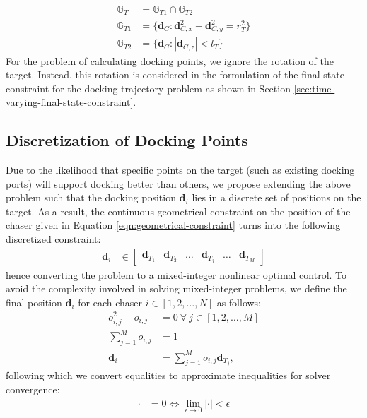 \begin{align}
    {\mathbb{G}}_T&={\mathbb{G}}_{T1}\cap{\mathbb{G}}_{T2}\\
    {\mathbb{G}}_{T1}&=\{\boldsymbol{d}_C:\boldsymbol{d}_{C,x}^2+\boldsymbol{d}_{C,y}^2=r_T^2\}\\
    {\mathbb{G}}_{T2}&=\{\boldsymbol{d}_C:|\boldsymbol{d}_{C,z}|<l_T\}
\end{align}
For the problem of calculating docking points, we ignore the rotation of the target. Instead, this rotation is considered in the formulation of the final state constraint for the docking trajectory problem as shown in Section \ref{sec:time-varying-final-state-constraint}.
\subsection{Discretization of Docking Points}
Due to the likelihood that specific points on the target (such as existing docking ports) will support docking better than others, we propose extending the above problem such that the docking position $\boldsymbol{d}_{i}$ lies in a discrete set of positions on the target.
As a result, the continuous geometrical constraint on the position of the chaser given in Equation \ref{eqn:geometrical-constraint} turns into the following discretized constraint:
\begin{align}
    \boldsymbol{d}_{i}&\in\begin{bmatrix}
        \boldsymbol{d}_{T_1}&\boldsymbol{d}_{T_2}&\ldots&\boldsymbol{d}_{T_j}&\ldots&\boldsymbol{d}_{T_M}
    \end{bmatrix}
\end{align}
hence converting the problem to a mixed-integer nonlinear optimal control.
To avoid the complexity involved in solving mixed-integer problems, we define the final position $\boldsymbol{d}_{i}$ for each chaser $i\in[1,2,\ldots,N]$ as follows:
\begin{align}
    o_{i,j}^2-o_{i,j}&=0\ \forall\ j\in[1, 2, \ldots, M]\\
    \sum_{j=1}^Mo_{i,j}&=1\\
    \boldsymbol{d}_{i}&=\sum_{j=1}^Mo_{i,j}\boldsymbol{d}_{T_j},
\end{align}
following which we convert equalities to approximate inequalities for solver convergence:
\begin{align}
    \cdot&=0\iff\lim_{\epsilon\rightarrow0}|\cdot|<\epsilon
\end{align}